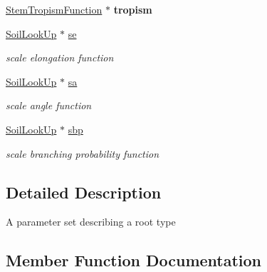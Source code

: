 \begin{DoxyCompactItemize}
\mbox{\label{classCPlantBox_1_1StemRandomOrganParameter_aeb249b83f5fd66ab1ffa186344a1028d}} 
\hyperlink{classCPlantBox_1_1StemTropismFunction}{Stem\+Tropism\+Function} $\ast$ {\bfseries tropism}
\item 
\mbox{\label{classCPlantBox_1_1StemRandomOrganParameter_a11e3a32412f22d44fc3403135d89293e}} 
\hyperlink{classCPlantBox_1_1SoilLookUp}{Soil\+Look\+Up} $\ast$ \hyperlink{classCPlantBox_1_1StemRandomOrganParameter_a11e3a32412f22d44fc3403135d89293e}{se}
\begin{DoxyCompactList}\small\item\em scale elongation function \end{DoxyCompactList}\item 
\mbox{\label{classCPlantBox_1_1StemRandomOrganParameter_a9097b0b3c38633d2794d6237f67a149d}} 
\hyperlink{classCPlantBox_1_1SoilLookUp}{Soil\+Look\+Up} $\ast$ \hyperlink{classCPlantBox_1_1StemRandomOrganParameter_a9097b0b3c38633d2794d6237f67a149d}{sa}
\begin{DoxyCompactList}\small\item\em scale angle function \end{DoxyCompactList}\item 
\mbox{\label{classCPlantBox_1_1StemRandomOrganParameter_a016e829e6a63507ca9fce95e010a9024}} 
\hyperlink{classCPlantBox_1_1SoilLookUp}{Soil\+Look\+Up} $\ast$ \hyperlink{classCPlantBox_1_1StemRandomOrganParameter_a016e829e6a63507ca9fce95e010a9024}{sbp}
\begin{DoxyCompactList}\small\item\em scale branching probability function \end{DoxyCompactList}\end{DoxyCompactItemize}


\subsection{Detailed Description}
A parameter set describing a root type 

\subsection{Member Function Documentation}
\mbox{\label{classCPlantBox_1_1StemRandomOrganParameter_a47497b8ac2a56f559f5fd9ff171741b1}} 

